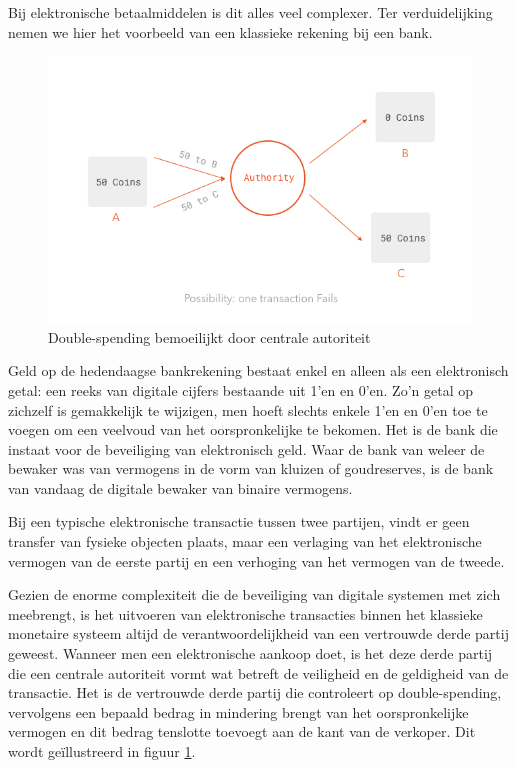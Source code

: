 			Bij elektronische betaalmiddelen is dit alles veel complexer. Ter verduidelijking nemen we hier het voorbeeld van een klassieke rekening bij een bank.
			
			\begin{figure}
				\includegraphics[width=\linewidth]{img/double_spending2.png}
				\caption{Double-spending bemoeilijkt door centrale autoriteit~\autocite{Peyrott2017}}
				\label{fig:double_spending2}
			\end{figure}
			
			 Geld op de hedendaagse bankrekening bestaat enkel en alleen als een elektronisch getal: een reeks van digitale cijfers bestaande uit 1’en en 0’en. Zo’n getal op zichzelf is gemakkelijk te wijzigen, men hoeft slechts enkele 1’en en 0’en toe te voegen om een veelvoud van het oorspronkelijke te bekomen. Het is de bank die instaat voor de beveiliging van elektronisch geld. Waar de bank van weleer de bewaker was van vermogens in de vorm van kluizen of goudreserves, is de bank van vandaag de digitale bewaker van binaire vermogens.
			
			Bij een typische elektronische transactie tussen twee partijen, vindt er geen transfer van fysieke objecten plaats, maar een verlaging van het elektronische vermogen van de eerste partij en een verhoging van het vermogen van de tweede. 
		
			Gezien de enorme complexiteit die de beveiliging van digitale systemen met zich meebrengt, is het uitvoeren van elektronische transacties binnen het klassieke monetaire systeem altijd de verantwoordelijkheid van een vertrouwde derde partij geweest. Wanneer men een elektronische aankoop doet, is het deze derde partij die een centrale autoriteit vormt wat betreft de veiligheid en de geldigheid van de transactie. Het is de vertrouwde derde partij die controleert op double-spending, vervolgens een bepaald bedrag in mindering brengt van het oorspronkelijke vermogen en dit bedrag tenslotte toevoegt aan de kant van de verkoper. Dit wordt geïllustreerd in figuur \ref{fig:double_spending2}.
			

